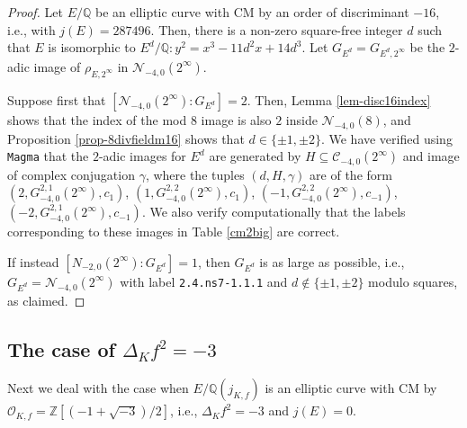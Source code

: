 \documentclass[11pt]{amsart}
\theoremstyle{definition}
\newcommand{\Q}{\mathbb Q}
\newcommand{\Z}{\mathbb Z}
\newcommand{\Of}{\mathcal{O}_{K,f}}
\begin{document}
\begin{proof}
    Let $E/\Q$ be an elliptic curve with CM by an order of discriminant $-16$, i.e., with $j(E) = 287496$. Then, there is a non-zero square-free integer $d$ such that $E$ is isomorphic to $E^d/\Q : y^2=x^3 - 11 d^2x + 14d^3$. Let $G_{E^d} = G_{E^d,2^\infty}$ be the $2$-adic image of $\rho_{E, 2^{\infty}}$ in $\mathcal{N}_{-4,0}(2^{\infty})$.

    Suppose first that $[\mathcal{N}_{-4,0}(2^{\infty}) : G_{E^d} ] = 2$. Then, Lemma \ref{lem-disc16index} shows that the index of the mod $8$ image is also $2$ inside $\mathcal{N}_{-4,0}(8)$, and Proposition \ref{prop-8divfieldm16} shows that $d \in \{ \pm 1, \pm 2 \}$. We have verified using \verb|Magma| that the $2$-adic images for $E^d$ are generated by $H \subseteq \mathcal{C}_{-4, 0}(2^{\infty})$ and image of complex conjugation $\gamma$, where the tuples $(d, H, \gamma)$ are of the form $(2, G^{2,1}_{-4,0}(2^{\infty}), c_1)$, $(1, G^{2,2}_{-4,0}(2^{\infty}), c_1)$, $(-1, G^{2,2}_{-4,0}(2^{\infty}), c_{-1})$, $(-2, G^{2,1}_{-4,0}(2^{\infty}), c_{-1})$. We also verify computationally that the labels corresponding to these images in Table \ref{cm2big} are correct.

    If instead $[N_{-2, 0}(2^{\infty}) : G_{E^d}] = 1$, then $G_{E^d}$ is as large as possible, i.e., $G_{E^d} = \mathcal{N}_{-4,0}(2^{\infty})$ with label \texttt{2.4.ns7-1.1.1} and $d \notin \{ \pm 1, \pm 2 \}$ modulo squares, as claimed.
\end{proof}

\subsection{The case of $\Delta_K f^2= -3$}\label{sec-delta3}

 Next we deal with the case when $E/\Q(j_{K,f})$ is an elliptic curve with CM by $\Of=\Z[(-1+\sqrt{-3})/2]$, i.e., $\Delta_K f^2 = -3$ and $j(E)=0$.
\end{document}
